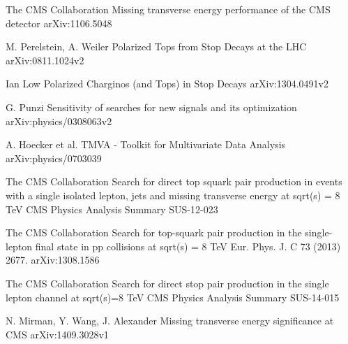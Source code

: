\begin{thebibliography}{2}

             {The CMS Collaboration}
             {Missing transverse energy performance of the CMS detector}
             {arXiv:1106.5048}


             {M. Perelstein, A. Weiler}
             {Polarized Tops from Stop Decays at the LHC}
             {arXiv:0811.1024v2}

             {Ian Low}
             {Polarized Charginos (and Tops) in Stop Decays}
             {arXiv:1304.0491v2}


             {G. Punzi}
             {Sensitivity of searches for new signals and its optimization}
             {arXiv:physics/0308063v2}

             {A. Hoecker et al.}
             {TMVA - Toolkit for Multivariate Data Analysis}
             {arXiv:physics/0703039}


             {The CMS Collaboration}
             {Search for direct top squark pair production in events with a single isolated lepton, jets and missing transverse energy at sqrt(s) = 8 TeV}
             {CMS Physics Analysis Summary SUS-12-023}

             {The CMS Collaboration}
             {Search for top-squark pair production in the single-lepton final state in pp collisions at sqrt(s) = 8 TeV}
             {Eur. Phys. J. C 73 (2013) 2677. arXiv:1308.1586}

             {The CMS Collaboration}
             {Search for direct stop pair production in the single lepton channel at sqrt(s)=8 TeV}
             {CMS Physics Analysis Summary SUS-14-015}


             {N. Mirman, Y. Wang, J. Alexander}
             {Missing transverse energy significance at CMS}
             {arXiv:1409.3028v1}



\end{thebibliography}
